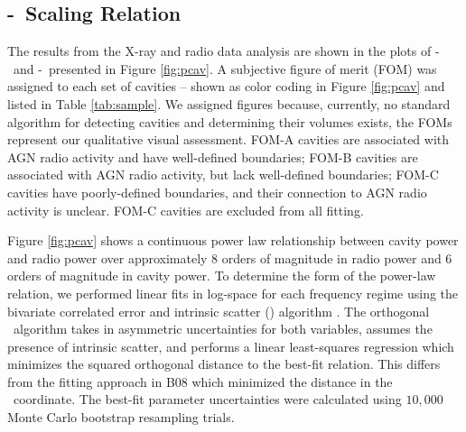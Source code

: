 \documentclass{emulateapj}
\begin{document}
\subsection{\pjet-\prad\ Scaling Relation}
\label{sec:relation}

The results from the X-ray and radio data analysis are shown in the
plots of \pcav-\phigh\ and \pcav-\plow\ presented in Figure
\ref{fig:pcav}. A subjective figure of merit (FOM) was assigned to
each set of cavities -- shown as color coding in Figure \ref{fig:pcav}
and listed in Table \ref{tab:sample}. We assigned figures because,
currently, no standard algorithm for detecting cavities and
determining their volumes exists, the FOMs represent our qualitative
visual assessment. FOM-A cavities are associated with AGN radio
activity and have well-defined boundaries; FOM-B cavities are
associated with AGN radio activity, but lack well-defined boundaries;
FOM-C cavities have poorly-defined boundaries, and their connection to
AGN radio activity is unclear. FOM-C cavities are excluded from all
fitting.

Figure \ref{fig:pcav} shows a continuous power law relationship
between cavity power and radio power over approximately 8 orders of
magnitude in radio power and 6 orders of magnitude in cavity power. To
determine the form of the power-law relation, we performed linear fits
in log-space for each frequency regime using the bivariate correlated
error and intrinsic scatter (\bces) algorithm \citep{bces}. The
orthogonal \bces\ algorithm takes in asymmetric uncertainties for both
variables, assumes the presence of intrinsic scatter, and performs a
linear least-squares regression which minimizes the squared orthogonal
distance to the best-fit relation. This differs from the fitting
approach in B08 which minimized the distance in the
\pcav\ coordinate. The best-fit parameter uncertainties were
calculated using $10,000$ Monte Carlo bootstrap resampling trials.
\end{document}
